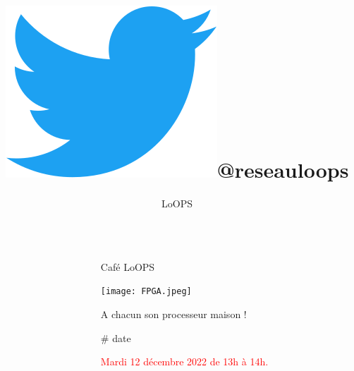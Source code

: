 \documentclass[final]{beamer}
\title{\includegraphics[width=0.05\linewidth]{Twitter_Bird.png}@reseauloops}%
\author{LoOPS} %
\institute{@reseauloops} %
\newlength{\sepwid}
\newlength{\twocolwid}
\begin{document}

\setlength{\belowcaptionskip}{3ex} %
\setlength\belowdisplayshortskip{3ex} %


\begin{frame}[t] %

\begin{columns}[t] %

\begin{column}{\sepwid}\end{column} %

\begin{column}{\twocolwid} %

\vspace{-1.1in}

\begin{alertblock}{
    \vspace{-0.5in}
    \large{Caf\'{e} LoOPS}
    
    \vspace{0.5in}
    \texttt{[image: FPGA.jpeg]}

    \large{A chacun son processeur maison !}}
    \vspace{-0.5in}
\end{alertblock}

\vspace{-1.1in}

\begin{block}{\# date}

{\textcolor{red}{
     Mardi 12 d\'{e}cembre 2022 de 13h \`{a} 14h.
}}


\end{block}
\end{column}
\end{columns}
\end{frame}
\end{document}
